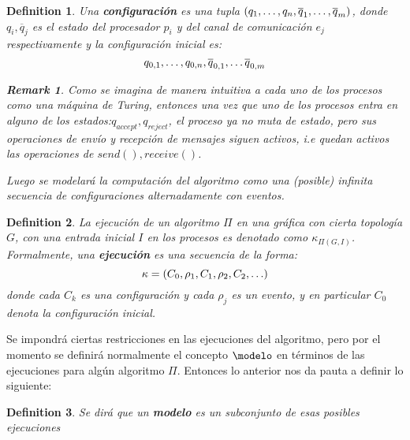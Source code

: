 \documentclass[10pt]{report}
\newtheorem*{remark}{Remark}
\newtheorem{definition}{Definition}
\begin{document}
    \begin{definition}
        Una \textbf{configuración} es una tupla $(q_{1},\mathellipsis,q_{n},\overline{q}_{1},\mathellipsis,\overline{q}_{m})$,
        donde $q_{i},\overline{q}_{j}$ es el estado del procesador $p_{i}$ y del canal de comunicación $e_{j}$ respectivamente
        y la configuración inicial es:
        \begin{equation}
        q_{0,1},\mathellipsis,q_{0,n},\overline{q}_{0,1},\mathellipsis \overline{q}_{0,m}\label{eq:equation5}
        \end{equation}

        \begin{remark}
            Como se imagina de manera intuitiva a cada uno de los procesos como una máquina de Turing, entonces
            una vez que uno de los procesos entra en alguno de los estados:\space $q_{accept},q_{reject}$, el proceso ya no muta
            de estado, pero sus operaciones de envío y recepción de mensajes siguen activos, i.e quedan activos las
            operaciones de $send(),receive()$.
        \end{remark}
        \newline
        Luego se modelará la computación del algoritmo como una (posible) infinita secuencia de configuraciones
        alternadamente con eventos.
    \end{definition}
    \theoremstyle{definition}
    \begin{definition}
        La ejecución de un algoritmo $\Pi$ en una gráfica con cierta topología
        $G$, con una entrada inicial $I$ en los procesos es denotado como $\kappa_{\Pi(G,I)}$.
        Formalmente, una \textbf{ejecución} es una secuencia de la forma:
        \begin{equation}
            \kappa = (C_{0},\rho_{1},C_{1},\rho_{2},C_{2},\mathellipsis)\label{eq:equation3}
        \end{equation}
        donde cada $C_{k}$ es una configuración y cada $\rho_{j}$ es un evento,
        y en particular $C_{0}$ denota la configuración inicial.
    \end{definition}
    Se impondrá ciertas restricciones en las ejecuciones del algoritmo, pero por el momento
    se definirá normalmente el concepto $\modelo$ en términos de las ejecuciones para algún algoritmo
    $\Pi$.\newline
    Entonces lo anterior nos da pauta a definir lo siguiente:
    \begin{definition}
        Se dirá que un \textbf{modelo} es un subconjunto de esas posibles ejecuciones
    \end{definition}
\end{document}
